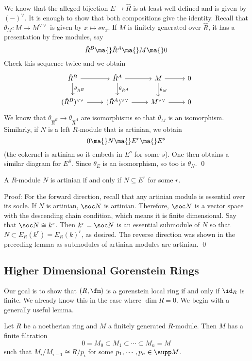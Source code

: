 We know that the alleged bijection $E \to \hat{R}$ is at least well defined and is given by $(-)^\vee$. It is enough to show that both compositions give the identity. Recall that $\theta_M: M \to M^{\vee\vee}$ is given by $x \mapsto \text{ev}_x$. If $M$ is finitely generated over $\hat{R}$, it has a presentation by free modules, say
\[
\hat{R}^B \ma{} \hat{R}^A \ma{} M \ma{} 0
\]
Check this sequence twice and we obtain
\[
\begin{tikzcd}
\hat{R}^B \arrow{d}{\theta_{\hat{R}^B}} \arrow{r} & \hat{R}^A \arrow{d}{\theta_{\hat{R}^A}} \arrow{r} & M \arrow{d}{\theta_M} \arrow{r} & 0 \\
(\hat{R}^B)^{\vee\vee} \arrow{r} & (\hat{R}^A)^{\vee\vee} \arrow{r} & M^{\vee\vee} \arrow{r} & 0
\end{tikzcd}
\]
We know that $\theta_{\hat{R}^B} \to \theta_{\hat{R}^A}$ are isomorphisms so that $\theta_M$ is an isomorphism. Similarly, if $N$ is a left $R$-module that is artinian, we obtain
\[
0 \ma{} N \ma{} E^r \ma{} E^s
\]
(the cokernel is artinian so it embeds in $E^s$ for some $s$). One then obtains a similar diagram for $E^S$. Since $\theta_E$ is an isomorphism, so too is $\theta_N$. \qed \\

\begin{cor}
A $R$-module $N$ is artinian if and only if $N \subseteq E^r$ for some $r$. 
\end{cor}

\noindent Proof: For the forward direction, recall that any artinian module is essential over its socle. If $N$ is artinian, $\soc N$ is artinian. Therefore, $\soc N$ is a vector space with the descending chain condition, which means it is finite dimensional. Say that $\soc N \cong k^r$. Then $k^r=\soc N$ is an essential submodule of $N$ so that $N \subset E_R(k^r)=E_R(k)^r$, as desired. The reverse direction was shown in the preceding lemma as submodules of artinian modules are artinian. \qed \\

\subsection{Higher Dimensional Gorenstein Rings}

Our goal is to show that $(R,\fm)$ is a gorenstein local ring if and only if $\id_R$ is finite. We already know this in the case where $\dim R=0$. We begin with a generally useful lemma.

\begin{lem}
Let $R$ be a noetherian ring and $M$ a finitely generated $R$-module. Then $M$ has a finite filtration 
\[
0=M_0 \subset M_1 \subset \cdots \subset M_n=M
\]
such that $M_i/M_{i-1} \cong R/p_i$ for some $p_1,\cdots,p_n \in \supp M$. 
\end{lem}

